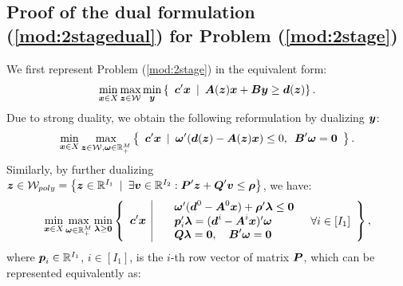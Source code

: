 \documentclass[fleqn,mnsc,blindrev]{informs4}
\newcommand{\mb}[1]{\mbox{\boldmath \ensuremath{#1}}}
\begin{document}
\begin{appendices}
	\section{Proof of the dual formulation (\ref{mod:2stagedual}) for  Problem (\ref{mod:2stage})  \label{proof:primaldual}} 
	We first represent Problem (\ref{mod:2stage}) in the equivalent form:
\begin{equation*}
		\min_{\boldsymbol{x} \in X} \max_{\boldsymbol{z} \in \mathcal{W}} \min_{\boldsymbol{y}}\left\{ \enskip \mb{c}'\mb{x} \enskip | \enskip  \mb{A}(\mb{z})\mb{x}+\mb{B}\mb{y} \geq\mb{d}(\mb{z}) \right\}.
\end{equation*}
	Due to strong duality, we obtain the following reformulation by dualizing $\mb{y}$:
\begin{equation*}
	\min_{\boldsymbol{x} \in X} \max_{\boldsymbol{z} \in \mathcal{W}, \boldsymbol{\omega} \in \mathbb{R}^{M}_+} \left\{ \enskip\mb{c}'\mb{x}  \enskip | \enskip  \mb{\omega}'(\mb{d}(\mb{z}) -\mb{A}(\mb{z})\mb{x}) \le 0, \enskip \mb{B}'\mb{\omega} =\mb{0} \enskip \right\}.
\end{equation*}
	Similarly, by further dualizing $\boldsymbol{z}\in \mathcal{W}_{poly} = \left\{\mb{z}\in \mathbb{R}^{I_1} \enskip |\enskip \exists \mb{v} \in \mathbb{R}^{I_2}: \mb{P}'\mb{z} + \mb{Q}'\mb{v} \le \mb{\rho} \right\}$, we have:
\begin{equation*}
	\min_{\boldsymbol{x} \in X} \max_{ \boldsymbol{\omega} \in \mathbb{R}^{M}_+} \min_{\boldsymbol{\lambda} \ge \boldsymbol{0}} \left\{ \enskip\mb{c}'\mb{x} \enskip \vline \enskip \begin{array}{lll}
	&  \mb{\omega}' (\mb{d}^0 -\mb{A}^0\mb{x}) + \mb{\rho}'\mb{\lambda} \le \mb{0} \\
	&\mb{p}_i'\mb{\lambda} = (\mb{d}^i- \mb{A}^i\mb{x})'\mb{\omega} &  \enskip \forall i\in [I_1]\\
	&\displaystyle  \mb{Q}\mb{\lambda} = \mb{0}, \quad  \mb{B}'\mb{\omega} =\mb{0} \\
	\end{array}
	\right\},
\end{equation*}
where $\mb{p}_i\in \mathbb{R}^{I_1}$, $i\in [I_1]$, is the $i$-th row vector of matrix $\mb{P}$, which can be represented equivalently as:


\end{appendices}
\end{document}
